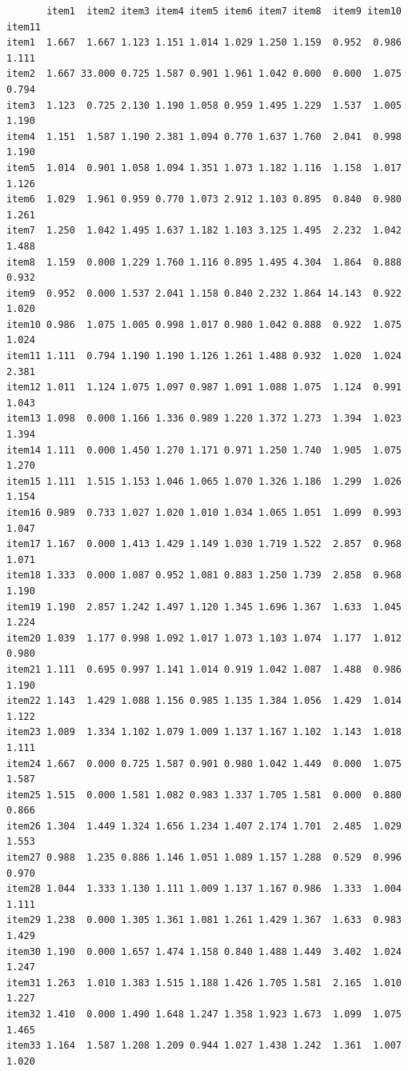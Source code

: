 \documentclass[
  a4paper,
]{ltjsbook}
\begin{document}
\begin{verbatim}
       item1  item2 item3 item4 item5 item6 item7 item8  item9 item10 item11
item1  1.667  1.667 1.123 1.151 1.014 1.029 1.250 1.159  0.952  0.986  1.111
item2  1.667 33.000 0.725 1.587 0.901 1.961 1.042 0.000  0.000  1.075  0.794
item3  1.123  0.725 2.130 1.190 1.058 0.959 1.495 1.229  1.537  1.005  1.190
item4  1.151  1.587 1.190 2.381 1.094 0.770 1.637 1.760  2.041  0.998  1.190
item5  1.014  0.901 1.058 1.094 1.351 1.073 1.182 1.116  1.158  1.017  1.126
item6  1.029  1.961 0.959 0.770 1.073 2.912 1.103 0.895  0.840  0.980  1.261
item7  1.250  1.042 1.495 1.637 1.182 1.103 3.125 1.495  2.232  1.042  1.488
item8  1.159  0.000 1.229 1.760 1.116 0.895 1.495 4.304  1.864  0.888  0.932
item9  0.952  0.000 1.537 2.041 1.158 0.840 2.232 1.864 14.143  0.922  1.020
item10 0.986  1.075 1.005 0.998 1.017 0.980 1.042 0.888  0.922  1.075  1.024
item11 1.111  0.794 1.190 1.190 1.126 1.261 1.488 0.932  1.020  1.024  2.381
item12 1.011  1.124 1.075 1.097 0.987 1.091 1.088 1.075  1.124  0.991  1.043
item13 1.098  0.000 1.166 1.336 0.989 1.220 1.372 1.273  1.394  1.023  1.394
item14 1.111  0.000 1.450 1.270 1.171 0.971 1.250 1.740  1.905  1.075  1.270
item15 1.111  1.515 1.153 1.046 1.065 1.070 1.326 1.186  1.299  1.026  1.154
item16 0.989  0.733 1.027 1.020 1.010 1.034 1.065 1.051  1.099  0.993  1.047
item17 1.167  0.000 1.413 1.429 1.149 1.030 1.719 1.522  2.857  0.968  1.071
item18 1.333  0.000 1.087 0.952 1.081 0.883 1.250 1.739  2.858  0.968  1.190
item19 1.190  2.857 1.242 1.497 1.120 1.345 1.696 1.367  1.633  1.045  1.224
item20 1.039  1.177 0.998 1.092 1.017 1.073 1.103 1.074  1.177  1.012  0.980
item21 1.111  0.695 0.997 1.141 1.014 0.919 1.042 1.087  1.488  0.986  1.190
item22 1.143  1.429 1.088 1.156 0.985 1.135 1.384 1.056  1.429  1.014  1.122
item23 1.089  1.334 1.102 1.079 1.009 1.137 1.167 1.102  1.143  1.018  1.111
item24 1.667  0.000 0.725 1.587 0.901 0.980 1.042 1.449  0.000  1.075  1.587
item25 1.515  0.000 1.581 1.082 0.983 1.337 1.705 1.581  0.000  0.880  0.866
item26 1.304  1.449 1.324 1.656 1.234 1.407 2.174 1.701  2.485  1.029  1.553
item27 0.988  1.235 0.886 1.146 1.051 1.089 1.157 1.288  0.529  0.996  0.970
item28 1.044  1.333 1.130 1.111 1.009 1.137 1.167 0.986  1.333  1.004  1.111
item29 1.238  0.000 1.305 1.361 1.081 1.261 1.429 1.367  1.633  0.983  1.429
item30 1.190  0.000 1.657 1.474 1.158 0.840 1.488 1.449  3.402  1.024  1.247
item31 1.263  1.010 1.383 1.515 1.188 1.426 1.705 1.581  2.165  1.010  1.227
item32 1.410  0.000 1.490 1.648 1.247 1.358 1.923 1.673  1.099  1.075  1.465
item33 1.164  1.587 1.208 1.209 0.944 1.027 1.438 1.242  1.361  1.007  1.020

\end{verbatim}
\end{document}
